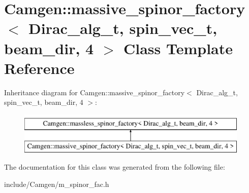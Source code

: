 \hypertarget{a00344}{\section{Camgen\-:\-:massive\-\_\-spinor\-\_\-factory$<$ Dirac\-\_\-alg\-\_\-t, spin\-\_\-vec\-\_\-t, beam\-\_\-dir, 4 $>$ Class Template Reference}
\label{a00344}
}
Inheritance diagram for Camgen\-:\-:massive\-\_\-spinor\-\_\-factory$<$ Dirac\-\_\-alg\-\_\-t, spin\-\_\-vec\-\_\-t, beam\-\_\-dir, 4 $>$\-:\begin{figure}[H]
\begin{center}
\leavevmode
\includegraphics[height=2.000000cm]{a00344}
\end{center}
\end{figure}


The documentation for this class was generated from the following file\-:\begin{DoxyCompactItemize}
\item 
include/\-Camgen/m\-\_\-spinor\-\_\-fac.\-h\end{DoxyCompactItemize}
